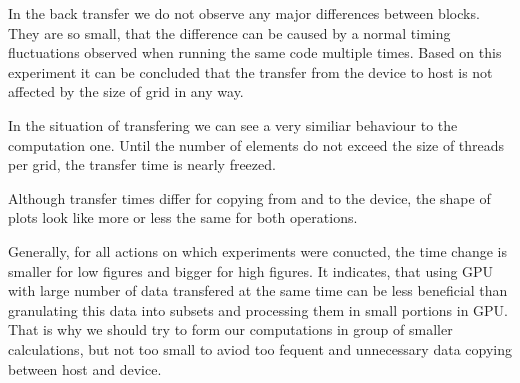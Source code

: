 \documentclass[12pt]{article}
\begin{document}
In the back transfer we do not observe any major differences between blocks. They are so small, that the difference can be caused by a normal timing fluctuations observed when running the same code multiple times. Based on this experiment it can be concluded that the transfer from the device to host is not affected by the size of grid in any way.



In the situation of transfering we can see a very similiar behaviour to the computation one. Until the number of elements do not exceed the size of threads per grid, the transfer time is nearly freezed.

Although transfer times differ for copying from and to the device, the shape of plots look like more or less the same for both operations.

Generally, for all actions on which experiments were conucted, the time change is smaller for low figures  and bigger for high figures. It indicates, that using GPU with large number of data transfered at the same time can be less beneficial than granulating this data into subsets and processing them in small portions in GPU. That is why we should try to form our computations in group of smaller calculations, but not too small to aviod too fequent and unnecessary data copying between host and device.
\end{document}
